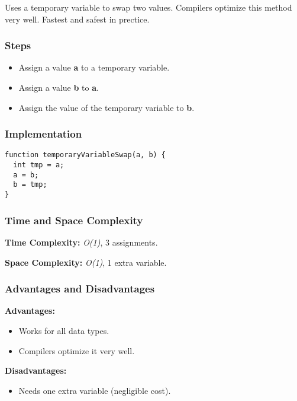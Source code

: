 Uses a temporary variable to swap two values. Compilers optimize this method very well. Fastest and safest in prectice.

\subsubsection*{Steps}

\begin{itemize}
  \item Assign a value \textbf{a} to a temporary variable.
  \item Assign a value \textbf{b} to \textbf{a}.
  \item Assign the value of the temporary variable to \textbf{b}.
\end{itemize}

\subsubsection*{Implementation}

\begin{lstlisting}[style=general]
function temporaryVariableSwap(a, b) {
  int tmp = a;
  a = b;
  b = tmp;
}
\end{lstlisting}

\subsubsection*{Time and Space Complexity}

\textbf{Time Complexity:} \textit{O(1)}, 3 assignments.

\textbf{Space Complexity:} \textit{O(1)}, 1 extra variable.

\subsubsection*{Advantages and Disadvantages}

\textbf{Advantages:}

\begin{itemize}
  \item Works for all data types.
  \item Compilers optimize it very well.
\end{itemize}

\textbf{Disadvantages:}

\begin{itemize}
  \item Needs one extra variable (negligible cost).
\end{itemize}
